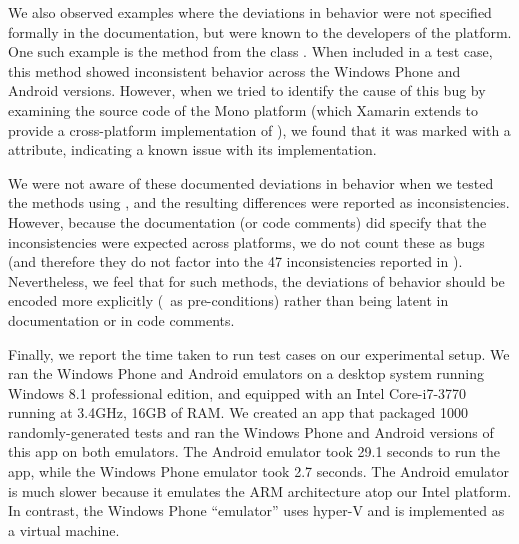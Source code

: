 \begin{mylist}
We also observed examples where the deviations in behavior were not specified
formally in the documentation, but were known to the developers of the
platform. One such example is the method  from the
class . When included in a test case, this method
showed inconsistent behavior across the Windows Phone and Android versions.
However, when we tried to identify the cause of this bug by examining the
source code of the Mono platform (which Xamarin extends to provide a
cross-platform implementation of ), we found that it was marked with
a  attribute, indicating a known issue with its implementation.

We were not aware of these documented deviations in behavior when we tested the
methods using \tool, and the resulting differences were reported as
inconsistencies. However, because the documentation (or code comments) did
specify that the inconsistencies were expected across platforms, we do not
count these as bugs (and therefore they do not factor into the 47
inconsistencies reported in ).  Nevertheless, we
feel that for such methods, the deviations of behavior should be encoded more
explicitly (\eg~as pre-conditions) rather than being latent in documentation or
in code comments.
%
\end{mylist}


%
Finally, we report the time taken to run test cases on our experimental setup.
We ran the Windows Phone and Android emulators on a desktop system running
Windows 8.1 professional edition, and equipped with an Intel Core-i7-3770
running at 3.4GHz, 16GB of RAM. We created an app that packaged 1000
randomly-generated tests and ran the Windows Phone and Android versions of this
app on both emulators. The Android emulator took 29.1 seconds to run the app,
while the Windows Phone emulator took 2.7 seconds. The Android emulator is much
slower because it emulates the ARM architecture atop our Intel platform. In
contrast, the Windows Phone ``emulator'' uses hyper-V and is implemented as a
virtual machine.
